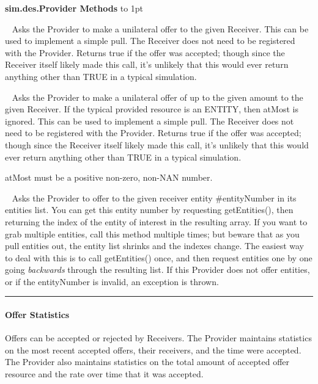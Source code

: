 \documentclass[twoside,10pt]{article}
\newcommand\class[1]{\index{Classes!{#1}}\textsf{#1}}
\newcommand*{\xfill}[1][0pt]{%
	\cleaders
		\hbox to 1pt{\hss
			\raisebox{#1}{\rule{1.2pt}{0.4pt}}%
			\hss}\hfill}
\newenvironment{methods}[1]{
\vspace{1.0em}\noindent\textsf{\textbf{#1 Methods}}\quad \xfill[0.5ex]
\vspace{-0.25em}
\begin{description}
\small}
{\end{description}\hrule\vspace{1.5em}}
\newcommand{\mthd}[1]{\item[{\sf #1}]~\newline}
\begin{document}
\begin{methods}{\class{sim.des.Provider}}
\mthd{public boolean provide(Receiver receiver)}
       Asks the Provider to make a unilateral offer to the given Receiver.  This can be used to implement
       a simple pull. The Receiver does not need to be registered with the Provider.
       Returns true if the offer was accepted; though since the Receiver itself likely made this call, 
       it's unlikely that this would ever return anything other than TRUE in a typical simulation.
\mthd{public boolean provide(Receiver receiver, double atMost)}
       Asks the Provider to make a unilateral offer of up to the given amount to the given Receiver.  
       If the typical provided resource is an ENTITY, then atMost is ignored. This can be used to implement
       a simple pull. The Receiver does not need to be registered with the Provider.
       Returns true if the offer was accepted; though since the Receiver itself likely made this call, 
       it's unlikely that this would ever return anything other than TRUE in a typical simulation.
       
      atMost must be a positive non-zero, non-NAN number.
\mthd{public boolean requestEntity(Receiver receiver, int entityNumber)}
       Asks the Provider to offer to the given receiver entity \#entityNumber in its entities list.  You can get this
       entity number by requesting getEntities(), then returning the index of the entity of interest
       in the resulting array.  If you want to grab multiple entities, call this method multiple times; but
       beware that as you pull entities out, the entity list shrinks and the indexes change.  The easiest
       way to deal with this is to call getEntities() once, and then request entities one by one going {\it backwards} 
       through the resulting list.    If this Provider does not offer entities, or if
       the entityNumber is invalid, an exception is thrown.

\end{methods}


\paragraph{Offer Statistics}
Offers can be accepted or rejected by Receivers.  The Provider maintains statistics on the most recent accepted offers, their receivers, and the time were accepted.   The Provider also maintains statistics on the total amount of accepted offer resource and the rate over time that it was accepted.
\end{document}
